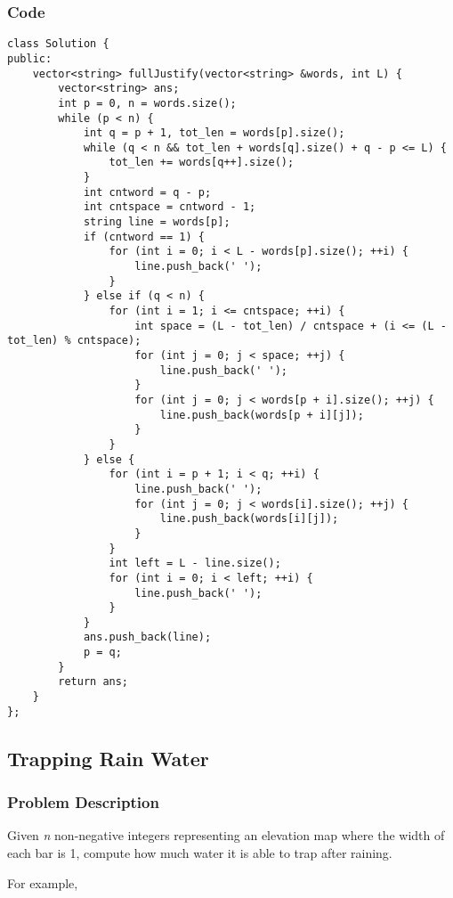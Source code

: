 \documentclass[courier]{article}
\begin{document}
\begin{CJK*}{UTF8}{gkai}
\subsubsection*{Code}
\begin{lstlisting}
class Solution {
public:
    vector<string> fullJustify(vector<string> &words, int L) {
        vector<string> ans;
        int p = 0, n = words.size();
        while (p < n) {
            int q = p + 1, tot_len = words[p].size();
            while (q < n && tot_len + words[q].size() + q - p <= L) {
                tot_len += words[q++].size();
            }
            int cntword = q - p;
            int cntspace = cntword - 1;
            string line = words[p];
            if (cntword == 1) {
                for (int i = 0; i < L - words[p].size(); ++i) {
                    line.push_back(' ');
                }
            } else if (q < n) {
                for (int i = 1; i <= cntspace; ++i) {
                    int space = (L - tot_len) / cntspace + (i <= (L - tot_len) % cntspace);
                    for (int j = 0; j < space; ++j) {
                        line.push_back(' ');
                    }
                    for (int j = 0; j < words[p + i].size(); ++j) {
                        line.push_back(words[p + i][j]);
                    }
                }
            } else {
                for (int i = p + 1; i < q; ++i) {
                    line.push_back(' ');
                    for (int j = 0; j < words[i].size(); ++j) {
                        line.push_back(words[i][j]);
                    }
                }
                int left = L - line.size();
                for (int i = 0; i < left; ++i) {
                    line.push_back(' ');
                }
            }
            ans.push_back(line);
            p = q;
        }
        return ans;
    }
}; 
\end{lstlisting}


\subsection{ Trapping Rain Water }

\subsubsection*{Problem Description}
Given \emph{n} non-negative integers representing an elevation map where the width of each bar is 1, compute how much water it is able to trap after raining.

For example, 



\end{CJK*}
\end{document}
